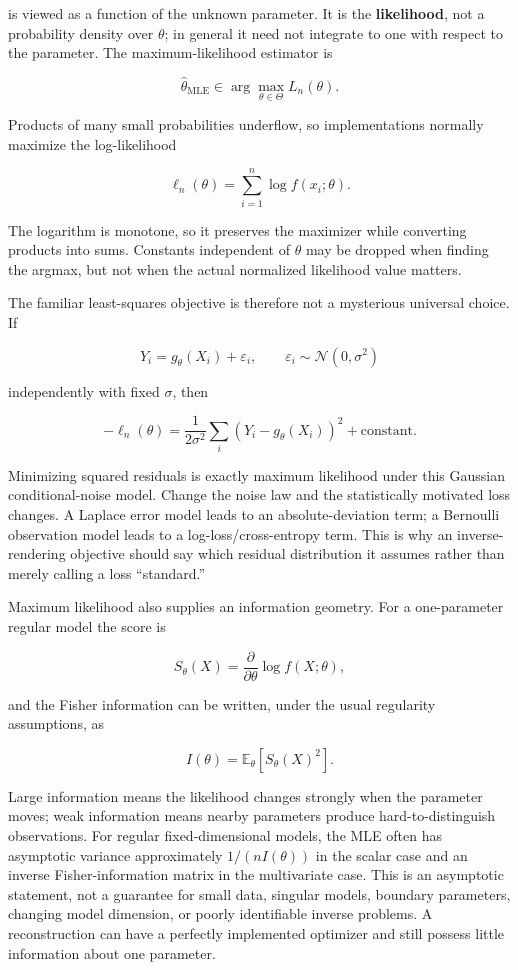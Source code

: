 is viewed as a function of the unknown parameter. It is the \textbf{likelihood}, not a probability density over \(\theta\); in general it need not integrate to one with respect to the parameter. The maximum-likelihood estimator is

\[
\hat\theta_{\mathrm{MLE}}\in\arg\max_{\theta\in\Theta}L_n(\theta).
\]

Products of many small probabilities underflow, so implementations normally maximize the log-likelihood

\[
\ell_n(\theta)=\sum_{i=1}^{n}\log f(x_i;\theta).
\]

The logarithm is monotone, so it preserves the maximizer while converting products into sums. Constants independent of \(\theta\) may be dropped when finding the argmax, but not when the actual normalized likelihood value matters.

The familiar least-squares objective is therefore not a mysterious universal choice. If

\[
Y_i=g_\theta(X_i)+\varepsilon_i,\qquad
\varepsilon_i\sim\mathcal N(0,\sigma^2)
\]

independently with fixed \(\sigma\), then

\[
-\ell_n(\theta)
=
\frac{1}{2\sigma^2}\sum_i
\left(Y_i-g_\theta(X_i)\right)^2
+\text{constant}.
\]

Minimizing squared residuals is exactly maximum likelihood under this Gaussian conditional-noise model. Change the noise law and the statistically motivated loss changes. A Laplace error model leads to an absolute-deviation term; a Bernoulli observation model leads to a log-loss/cross-entropy term. This is why an inverse-rendering objective should say which residual distribution it assumes rather than merely calling a loss ``standard.''

Maximum likelihood also supplies an information geometry. For a one-parameter regular model the score is

\[
S_\theta(X)=\frac{\partial}{\partial\theta}\log f(X;\theta),
\]

and the Fisher information can be written, under the usual regularity assumptions, as

\[
I(\theta)=
\mathbb E_\theta[S_\theta(X)^2].
\]

Large information means the likelihood changes strongly when the parameter moves; weak information means nearby parameters produce hard-to-distinguish observations. For regular fixed-dimensional models, the MLE often has asymptotic variance approximately \(1/(nI(\theta))\) in the scalar case and an inverse Fisher-information matrix in the multivariate case. This is an asymptotic statement, not a guarantee for small data, singular models, boundary parameters, changing model dimension, or poorly identifiable inverse problems. A reconstruction can have a perfectly implemented optimizer and still possess little information about one parameter.

